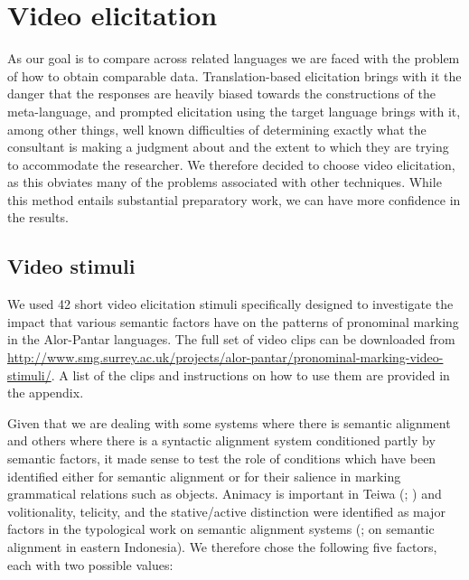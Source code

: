 \section{Video elicitation}
\label{sec:10:4}
As our goal is to compare across related languages we are faced with the problem of how to obtain comparable data. Translation-based elicitation brings with it the danger that the responses are heavily biased towards the constructions of the meta-language, and prompted elicitation using the target language brings with it, among other things, well known difficulties of determining exactly what the consultant is making a judgment about and the extent to which they are trying to accommodate the researcher. We therefore decided to choose video elicitation, as this obviates many of the problems associated with other techniques. While this method entails substantial preparatory work, we can have more confidence in the results.

\subsection{Video stimuli}
\label{sec:10:4.1}
We used 42 short video elicitation stimuli specifically designed to investigate the impact that various semantic factors have on the patterns of pronominal marking in the Alor-Pantar languages. The full set of video clips can be downloaded from \url{http://www.smg.surrey.ac.uk/projects/alor-pantar/pronominal-marking-video-stimuli/}. A list of the clips and instructions on how to use them are provided in the appendix.

  Given that we are dealing with some systems where there is semantic alignment and others where there is a syntactic alignment system conditioned partly by semantic factors, it made sense to test the role of conditions which have been identified either for semantic alignment or for their salience in marking grammatical relations such as objects. Animacy is important in Teiwa (\citealt[171]{Klamer2010grammar}; \citealt{KlamerEtAl2006}) and volitionality, telicity, and the stative/active distinction were identified as major factors in the typological work on semantic alignment systems (\citealt{Arkadiev2008}; \citealt{Klamer2008} on semantic alignment in eastern Indonesia). We therefore chose the following five factors, each with two possible values:
  
